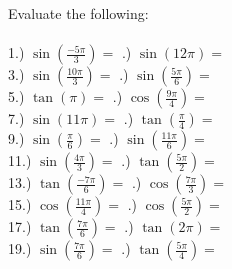 \documentclass[12pt]{article}
\begin{document}
Evaluate the following:
\\\\

1.) $\sin(\frac{-5\pi}{3}) = $ \underline{\hspace{2cm}} \indent\indent\indent{}.) $\sin(12\pi) = $ \underline{\hspace{2cm}} \\

3.) $\sin(\frac{10\pi}{3}) = $ \underline{\hspace{2cm}} \indent\indent\indent{}.) $\sin(\frac{5\pi}{6}) = $ \underline{\hspace{2cm}} \\

5.) $\tan(\pi) = $ \underline{\hspace{2cm}} \indent\indent\indent{}.) $\cos(\frac{9\pi}{4}) = $ \underline{\hspace{2cm}} \\

7.) $\sin(11\pi) = $ \underline{\hspace{2cm}} \indent\indent\indent{}.) $\tan(\frac{\pi}{4}) = $ \underline{\hspace{2cm}} \\

9.) $\sin(\frac{\pi}{6}) = $ \underline{\hspace{2cm}} \indent\indent\indent{}.) $\sin(\frac{11\pi}{6}) = $ \underline{\hspace{2cm}} \\

11.) $\sin(\frac{4\pi}{3}) = $ \underline{\hspace{2cm}} \indent\indent\indent{}.) $\tan(\frac{5\pi}{2}) = $ \underline{\hspace{2cm}} \\

13.) $\tan(\frac{-7\pi}{6}) = $ \underline{\hspace{2cm}} \indent\indent\indent{}.) $\cos(\frac{7\pi}{3}) = $ \underline{\hspace{2cm}} \\

15.) $\cos(\frac{11\pi}{4}) = $ \underline{\hspace{2cm}} \indent\indent\indent{}.) $\cos(\frac{5\pi}{2}) = $ \underline{\hspace{2cm}} \\

17.) $\tan(\frac{7\pi}{6}) = $ \underline{\hspace{2cm}} \indent\indent\indent{}.) $\tan(2\pi) = $ \underline{\hspace{2cm}} \\

19.) $\sin(\frac{7\pi}{6}) = $ \underline{\hspace{2cm}} \indent\indent\indent{}.) $\tan(\frac{5\pi}{4}) = $ \underline{\hspace{2cm}} \\
\end{document}
